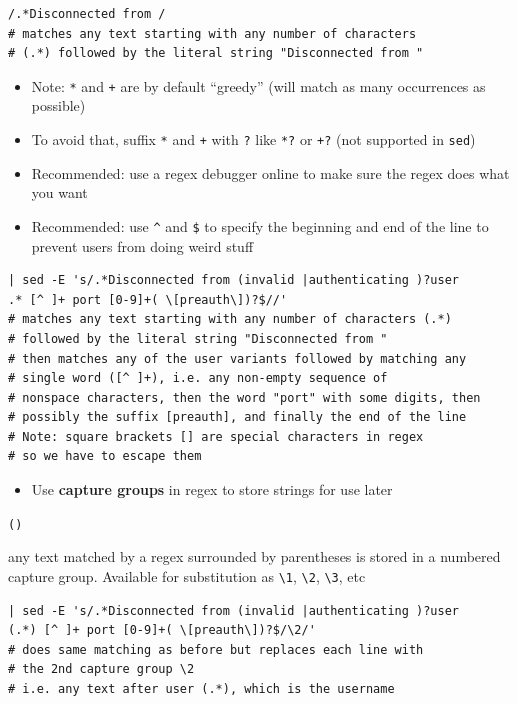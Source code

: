\documentclass[letterpaper,12pt]{article}
\newcommand*{\lstitem}[1]{
  \setbox0\hbox{\lstinline{#1}}
  \item[\usebox0]
}
\begin{document}
\begin{lstlisting}
/.*Disconnected from /
# matches any text starting with any number of characters
# (.*) followed by the literal string "Disconnected from "
\end{lstlisting}

\begin{itemize}
 \item Note: \lstinline{*} and \lstinline{+} are by default ``greedy'' (will match as many occurrences as possible)
 \item To avoid that, suffix \lstinline{*} and \lstinline{+}  with \lstinline{?} like \lstinline{*?} or \lstinline{+?} (not supported in \lstinline{sed})
 \item Recommended: use a regex debugger online to make sure the regex does what you want
 \item Recommended: use \lstinline{^} and \lstinline{$} to specify the beginning and end of the line to prevent users from doing weird stuff
\end{itemize}

\begin{lstlisting}
| sed -E 's/.*Disconnected from (invalid |authenticating )?user
.* [^ ]+ port [0-9]+( \[preauth\])?$//'
# matches any text starting with any number of characters (.*)
# followed by the literal string "Disconnected from "
# then matches any of the user variants followed by matching any
# single word ([^ ]+), i.e. any non-empty sequence of
# nonspace characters, then the word "port" with some digits, then
# possibly the suffix [preauth], and finally the end of the line
# Note: square brackets [] are special characters in regex
# so we have to escape them
\end{lstlisting}

\begin{itemize}
 \item Use \textbf{capture groups} in regex to store strings for use later
\end{itemize}

\begin{description}
 \lstitem{()} any text matched by a regex surrounded by parentheses is stored in a numbered capture group. Available for substitution as \lstinline{\1}, \lstinline{\2}, \lstinline{\3}, etc
\end{description}

\begin{lstlisting}
| sed -E 's/.*Disconnected from (invalid |authenticating )?user
(.*) [^ ]+ port [0-9]+( \[preauth\])?$/\2/'
# does same matching as before but replaces each line with
# the 2nd capture group \2
# i.e. any text after user (.*), which is the username
\end{lstlisting}
\end{document}
